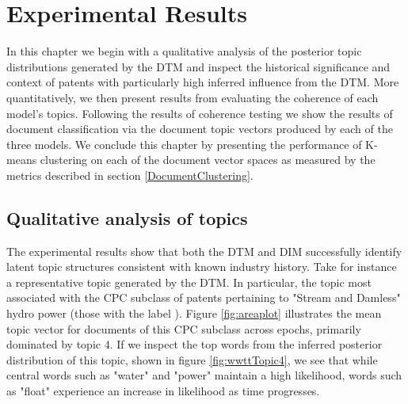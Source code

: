 
\chapter{Experimental Results} %

\label{Chapter4} %
In this chapter we begin with a qualitative analysis of the posterior topic distributions generated by the DTM and inspect the historical significance and context of patents with particularly high inferred influence from the DTM. More quantitatively, we then present results from evaluating the coherence of each model's topics. Following the results of coherence testing we show the results of document classification via the document topic vectors produced by each of the three models. We conclude this chapter by presenting the performance of K-means clustering on each of the document vector spaces as measured by the metrics described in section \ref{DocumentClustering}.


\section{Qualitative analysis of topics}
%

The experimental results show that both the DTM and DIM successfully identify latent topic structures consistent with known industry history. Take for instance a representative topic generated by the DTM. In particular, the topic most associated with the CPC subclass of patents pertaining to "Stream and Damless" hydro power (those with the label ). Figure \ref{fig:areaplot} illustrates the mean topic vector for documents of this CPC subclass across epochs, primarily dominated by topic 4. If we inspect the top words from the inferred posterior distribution of this topic, shown in figure \ref{fig:wwttTopic4}, we see that while central words such as "water" and "power" maintain a high likelihood, words such as "float" experience an increase in likelihood as time progresses. 

